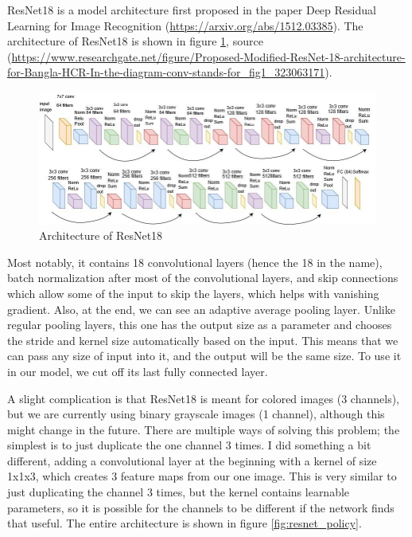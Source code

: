 \documentclass[
  digital,     %
  oneside,     %
  nosansbold,  %
  nocolorbold, %
  lof,         %
  lot,         %
]{fithesis4}
\begin{document}
ResNet18 is a model architecture first proposed in the paper Deep Residual Learning for Image Recognition (\url{https://arxiv.org/abs/1512.03385}). The architecture of ResNet18 is shown in figure \ref{fig:resnet}, source (\url{https://www.researchgate.net/figure/Proposed-Modified-ResNet-18-architecture-for-Bangla-HCR-In-the-diagram-conv-stands-for_fig1_323063171}).

\begin{figure}
    \centering
    \includegraphics[width=1\linewidth]{diagrams/resnet.png}
    \caption{Architecture of ResNet18}
    \label{fig:resnet}
\end{figure}

Most notably, it contains 18 convolutional layers (hence the 18 in the name), batch normalization after most of the convolutional layers, and skip connections which allow some of the input to skip the layers, which helps with vanishing gradient. Also, at the end, we can see an adaptive average pooling layer. Unlike regular pooling layers, this one has the output size as a parameter and chooses the stride and kernel size automatically based on the input. This means that we can pass any size of input into it, and the output will be the same size. To use it in our model, we cut off its last fully connected layer.

A slight complication is that ResNet18 is meant for colored images (3 channels), but we are currently using binary grayscale images (1 channel), although this might change in the future. There are multiple ways of solving this problem; the simplest is to just duplicate the one channel 3 times. I did something a bit different, adding a convolutional layer at the beginning with a kernel of size 1x1x3, which creates 3 feature maps from our one image. This is very similar to just duplicating the channel 3 times, but the kernel contains learnable parameters, so it is possible for the channels to be different if the network finds that useful. The entire architecture is shown in figure \ref{fig:resnet_policy}.
\end{document}
